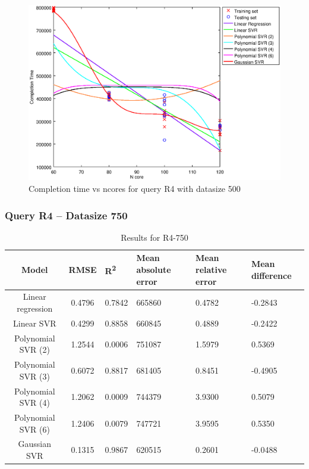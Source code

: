 \documentclass[a4paper,11pt]{article}
\begin{document}
\begin {figure}[hbtp]
\centering
\includegraphics[width=\textwidth]{output/R4_500_ONLY_1_LINEAR_NCORE/plot_R4_500.eps}
\caption{Completion time vs ncores for query R4 with datasize 500}
\label{fig:coreonly_linear_R4_500}
\end {figure}

\newpage
\subsubsection{Query R4 -- Datasize 750}
\begin{table}[H]
	\centering
	\begin{adjustbox}{center}
		\begin{tabular}{c | c M{1.2cm} M{2.5cm} M{2.5cm} M{1.8cm}}
			Model & RMSE & R\textsuperscript{2} & Mean absolute error & Mean relative error & Mean difference \tabularnewline
			\hline
			Linear regression & 0.4796 & 0.7842 & 665860 & 0.4782 & -0.2843 \\
			Linear SVR & 0.4299 & 0.8858 & 660845 & 0.4889 & -0.2422 \\
			Polynomial SVR (2) & 1.2544 & 0.0006 & 751087 & 1.5979 & 0.5369 \\
			Polynomial SVR (3) & 0.6072 & 0.8817 & 681405 & 0.8451 & -0.4905 \\
			Polynomial SVR (4) & 1.2062 & 0.0009 & 744379 & 3.9300 & 0.5079 \\
			Polynomial SVR (6) & 1.2406 & 0.0079 & 747721 & 3.9595 & 0.5350 \\
			Gaussian SVR & 0.1315 & 0.9867 & 620515 & 0.2601 & -0.0488 \\
		\end{tabular}
	\end{adjustbox}
	\\
	\caption{Results for R4-750}
	\label{fig:coreonly_linear_R4_750}
\end{table}
\end{document}
